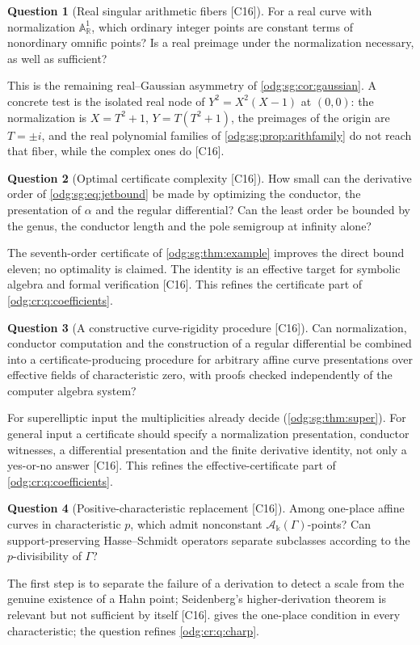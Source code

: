 \documentclass[11pt,oneside]{article}
\numberwithin{equation}{section}
\theoremstyle{definition}
\newtheorem{question}[question]{Question}
\theoremstyle{remark}
\newcommand{\R}{\mathbb R}
\newcommand{\src}[1]{\textup{\textsf{\small[#1]}}}
\newcommand{\crA}{\mathcal A_\Bbbk(\Gamma)}
\newcommand{\Aff}{\mathbb A}
\begin{document}
\begin{question}[Real singular arithmetic fibers \src{C16}]\label{odg:sg:q:real}
For a real curve with normalization $\Aff^1_\R$, which ordinary integer points are constant
terms of nonordinary omnific points? Is a real preimage under the normalization necessary,
as well as sufficient?
\end{question}
This is the remaining real--Gaussian asymmetry of \cref{odg:sg:cor:gaussian}. A concrete
test is the isolated real node of $Y^2=X^2(X-1)$ at $(0,0)$: the normalization is
$X=T^2+1$, $Y=T(T^2+1)$, the preimages of the origin are $T=\pm i$, and the real
polynomial families of \cref{odg:sg:prop:arithfamily} do not reach that fiber, while the
complex ones do \src{C16}.

\begin{question}[Optimal certificate complexity \src{C16}]\label{odg:sg:q:order}
How small can the derivative order of \eqref{odg:sg:eq:jetbound} be made by optimizing the
conductor, the presentation of $\alpha$ and the regular differential? Can the least order be
bounded by the genus, the conductor length and the pole semigroup at infinity alone?
\end{question}
The seventh-order certificate of \cref{odg:sg:thm:example} improves the direct bound eleven;
no optimality is claimed. The identity is an effective target for symbolic algebra and
formal verification \src{C16}. This refines the certificate part of
\cref{odg:cr:q:coefficients}.

\begin{question}[A constructive curve-rigidity procedure \src{C16}]\label{odg:sg:q:engine}
Can normalization, conductor computation and the construction of a regular differential be
combined into a certificate-producing procedure for arbitrary affine curve presentations
over effective fields of characteristic zero, with proofs checked independently of the
computer algebra system?
\end{question}
For superelliptic input the multiplicities already decide (\cref{odg:sg:thm:super}). For
general input a certificate should specify a normalization presentation, conductor
witnesses, a differential presentation and the finite derivative identity, not only a
yes-or-no answer \src{C16}. This refines the effective-certificate part of
\cref{odg:cr:q:coefficients}.

\begin{question}[Positive-characteristic replacement \src{C16}]\label{odg:sg:q:charp}
Among one-place affine curves in characteristic $p$, which admit nonconstant $\crA$-points?
Can support-preserving Hasse--Schmidt operators separate subclasses according to the
$p$-divisibility of $\Gamma$?
\end{question}
The first step is to separate the failure of a derivation to detect a scale from the genuine
existence of a Hahn point; Seidenberg's higher-derivation theorem is relevant but not
sufficient by itself \src{C16}.  gives the one-place condition
in every characteristic; the question refines \cref{odg:cr:q:charp}.
\end{document}
